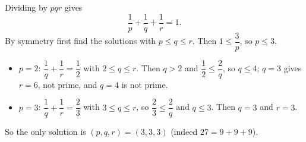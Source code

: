 Dividing by $pqr$ gives
\[\dfrac1p+\dfrac1q+\dfrac1r=1.\]
By symmetry first find the solutions with $p\le q\le r$. Then $1\le\dfrac3p$, so $p\le3$.
\begin{itemize}
\item $p=2$: $\dfrac1q+\dfrac1r=\dfrac12$ with $2\le q\le r$. Then $q>2$ and $\dfrac12\le\dfrac2q$, so $q\le4$; $q=3$ gives $r=6$, not prime, and $q=4$ is not prime.
\item $p=3$: $\dfrac1q+\dfrac1r=\dfrac23$ with $3\le q\le r$, so $\dfrac23\le\dfrac2q$ and $q\le3$. Then $q=3$ and $r=3$.
\end{itemize}
So the only solution is $\boxed{(p,q,r)=(3,3,3)}$ (indeed $27=9+9+9$).
